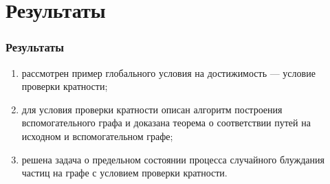 \documentclass{beamer}
\begin{document}
\section{Результаты}

\begin{frame}
\frametitle{Результаты}

	\begin{enumerate}
		\item рассмотрен пример глобального условия на достижимость --- условие проверки кратности;
		\item для условия проверки кратности описан алгоритм построения вспомогательного графа и доказана теорема о соответствии путей на исходном и вспомогательном графе;
		\item решена задача о предельном состоянии процесса случайного блуждания частиц на графе с условием проверки кратности.
	\end{enumerate} 

\end{frame}

\end{document}

